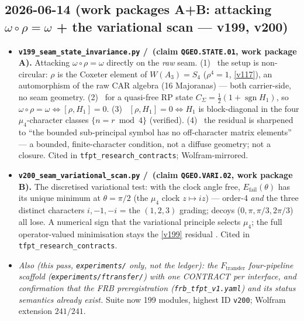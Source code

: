 \subsection*{2026-06-14 (work packages A+B: attacking $\omega\circ\rho=\omega$ + the variational scan --- v199, v200)}
\begin{itemize}
\item \textbf{\texttt{v199\_seam\_state\_invariance.py} \mE/\mO\ (claim \texttt{QGEO.STATE.01}, work package A).}
  Attacking $\omega\circ\rho=\omega$ directly on the \emph{raw} seam. (1) \mE\ the setup is non-circular:
  $\rho$ is the Coxeter element of $W(A_3)=S_4$ ($\rho^4=1$, \vref{v117}), an automorphism of the raw CAR
  algebra (16 Majoranas) --- both carrier-side, no seam geometry. (2) \mE\ for a quasi-free RP state
  $C_\Sigma=\tfrac12(1{+}\operatorname{sgn}H_1)$, so $\omega\circ\rho=\omega\Leftrightarrow[\rho,H_1]=0$.
  (3) \mE\ $[\rho,H_1]=0\Leftrightarrow H_1$ is block-diagonal in the four $\mu_4$-character classes
  $\{n{=}r\bmod4\}$ (verified). (4) \mO\ the residual is sharpened to ``the bounded sub-principal symbol has
  no off-character matrix elements'' --- a bounded, finite-character condition, not a diffuse geometry; not
  a closure. Cited in \texttt{tfpt\_research\_contracts}; Wolfram-mirrored.
\item \textbf{\texttt{v200\_seam\_variational\_scan.py} \mC/\mO\ (claim \texttt{QGEO.VARI.02}, work package B).}
  The discretised variational test: with the clock angle free, $E_{\mathrm{fail}}(\theta)$ has its unique
  minimum at $\theta=\pi/2$ (the $\mu_4$ clock $z\mapsto iz$) --- order-4 \emph{and} the three distinct
  characters $i,-1,-i$ = the $(1,2,3)$ grading; decoys ($0,\pi,\pi/3,2\pi/3$) all lose. A numerical sign
  that the variational principle selects $\mu_4$; the full operator-valued minimisation stays the
  \vref{v199} residual \mO. Cited in \texttt{tfpt\_research\_contracts}.
\item \emph{Also (this pass, \texttt{experiments/} only, not the ledger): the $F_{\mathrm{transfer}}$
  four-pipeline scaffold (\texttt{experiments/ftransfer/}) with one CONTRACT per interface, and confirmation
  that the FRB preregistration (\texttt{frb\_tfpt\_v1.yaml}) and its status semantics already exist.}
  Suite now 199 modules, highest ID \texttt{v200}; Wolfram extension $241/241$.
\end{itemize}

